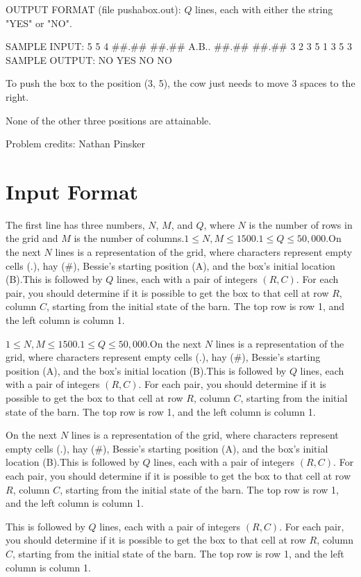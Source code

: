 \documentclass[12pt]{article}
\begin{document}
OUTPUT FORMAT (file pushabox.out):
$Q$ lines, each with either the string "YES" or "NO".

SAMPLE INPUT:
5 5 4
##.##
##.##
A.B..
##.##
##.##
3 2
3 5
1 3
5 3
SAMPLE OUTPUT: 
NO
YES
NO
NO

To push the box to the position (3, 5), the cow just needs to move 3 spaces to
the right.

None of the other three positions are attainable.


Problem credits: Nathan Pinsker



\section*{Input Format}
The first line has three numbers, $N$, $M$, and $Q$, where $N$ is the number of
rows in the grid and $M$ is the number of columns.$1 \le N,M \le 1500$.$1 \le Q \le 50,000$.On the next $N$ lines is a representation of the grid, where characters
represent empty cells (.), hay (#), Bessie's starting position (A), and the
box's initial location (B).This is followed by $Q$ lines, each with a pair of integers $(R, C)$. For each
pair, you should determine if it is possible to get the box to that cell at row
$R$, column $C$, starting from the initial state of the barn. The top row is row
1, and the left column is column 1.

$1 \le N,M \le 1500$.$1 \le Q \le 50,000$.On the next $N$ lines is a representation of the grid, where characters
represent empty cells (.), hay (#), Bessie's starting position (A), and the
box's initial location (B).This is followed by $Q$ lines, each with a pair of integers $(R, C)$. For each
pair, you should determine if it is possible to get the box to that cell at row
$R$, column $C$, starting from the initial state of the barn. The top row is row
1, and the left column is column 1.

On the next $N$ lines is a representation of the grid, where characters
represent empty cells (.), hay (#), Bessie's starting position (A), and the
box's initial location (B).This is followed by $Q$ lines, each with a pair of integers $(R, C)$. For each
pair, you should determine if it is possible to get the box to that cell at row
$R$, column $C$, starting from the initial state of the barn. The top row is row
1, and the left column is column 1.

This is followed by $Q$ lines, each with a pair of integers $(R, C)$. For each
pair, you should determine if it is possible to get the box to that cell at row
$R$, column $C$, starting from the initial state of the barn. The top row is row
1, and the left column is column 1.
\end{document}
